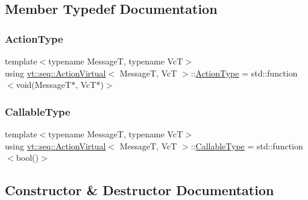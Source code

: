 \subsection{Member Typedef Documentation}
\mbox{\label{structvt_1_1seq_1_1_action_virtual_a878b5933c67038a3b6e27aaa218693aa}} 
\subsubsection{\texorpdfstring{Action\+Type}{ActionType}}
{\footnotesize\ttfamily template$<$typename MessageT, typename VcT$>$ \\
using \hyperlink{structvt_1_1seq_1_1_action_virtual}{vt\+::seq\+::\+Action\+Virtual}$<$ MessageT, VcT $>$\+::\hyperlink{structvt_1_1seq_1_1_action_virtual_a878b5933c67038a3b6e27aaa218693aa}{Action\+Type} =  std\+::function$<$void(MessageT$\ast$, VcT$\ast$)$>$}

\mbox{\label{structvt_1_1seq_1_1_action_virtual_a34bde8c3ecdadca35bc183f5e0dcca1c}} 
\subsubsection{\texorpdfstring{Callable\+Type}{CallableType}}
{\footnotesize\ttfamily template$<$typename MessageT, typename VcT$>$ \\
using \hyperlink{structvt_1_1seq_1_1_action_virtual}{vt\+::seq\+::\+Action\+Virtual}$<$ MessageT, VcT $>$\+::\hyperlink{structvt_1_1seq_1_1_action_virtual_a34bde8c3ecdadca35bc183f5e0dcca1c}{Callable\+Type} =  std\+::function$<$bool()$>$}



\subsection{Constructor \& Destructor Documentation}
\mbox{\label{structvt_1_1seq_1_1_action_virtual_a4ede676f74e0408e24db50f1bca7260a}} 
